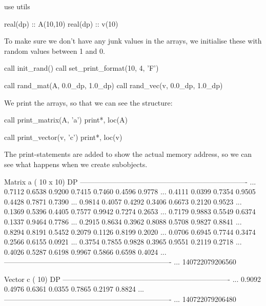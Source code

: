 \begin{fortrancodeenv}
use utils

real(dp) :: A(10,10)
real(dp) :: v(10)
\end{fortrancodeenv}

To make sure we don't have any junk values in the arrays, we initialise these with random values between 1 and 0.

\begin{fortrancodeenv}
call init_rand()
call set_print_format(10, 4, 'F')

call rand_mat(A, 0.0_dp, 1.0_dp)
call rand_vec(v, 0.0_dp, 1.0_dp)
\end{fortrancodeenv}

We print the arrays, so that we can see the structure:

\begin{fortrancodeenv}
call print_matrix(A, 'a')
print*, loc(A)

call print_vector(v, 'c')
print*, loc(v)
\end{fortrancodeenv}

The print-statements are added to show the actual memory address, so we can see what happens when we create subobjects.

\begin{fortrancodeenv}
Matrix a ( 10 x  10) DP
---------------------------------------------------------------------- ...
    0.7112    0.6538    0.9200    0.7415    0.7460    0.4596    0.9778 ... 0.4111    0.0399    0.7354    0.9505    0.4428    0.7871    0.7390 ...
    0.9814    0.4057    0.4292    0.3406    0.6673    0.2120    0.9523 ...
    0.1369    0.5396    0.4405    0.7577    0.9942    0.7274    0.2653 ...
    0.7179    0.9883    0.5549    0.6374    0.1337    0.9464    0.7786 ...
    0.2915    0.8634    0.3962    0.8088    0.5708    0.9827    0.8841 ...
    0.8294    0.8191    0.5452    0.2079    0.1126    0.8199    0.2020 ...
    0.0706    0.6945    0.7744    0.3474    0.2566    0.6155    0.0921 ...
    0.3754    0.7855    0.9828    0.3965    0.9551    0.2119    0.2718 ...
    0.4026    0.5287    0.6198    0.9967    0.5866    0.6598    0.4024 ...
---------------------------------------------------------------------- ...
      140722079206560

Vector c ( 10) DP
---------------------------------------------------------------------- ...
    0.9092    0.4976    0.6361    0.0355    0.7865    0.2197    0.8824 ...
---------------------------------------------------------------------- ...
      140722079206480
\end{fortrancodeenv}

